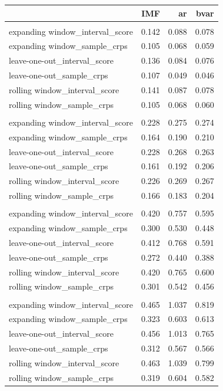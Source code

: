 \documentclass[
]{article}
\begin{document}
\newpage
\begin{longtable}{l|rrr}
\toprule
\multicolumn{1}{l}{} & IMF & ar & bvar \\ 
\midrule\addlinespace[2.5pt]
\multicolumn{4}{l}{horizon = 0} \\ 
\midrule\addlinespace[2.5pt]
expanding window\_interval\_score & 0.142 & 0.088 & 0.078 \\ 
expanding window\_sample\_crps & 0.105 & 0.068 & 0.059 \\ 
leave-one-out\_interval\_score & 0.136 & 0.084 & 0.076 \\ 
leave-one-out\_sample\_crps & 0.107 & 0.049 & 0.046 \\ 
rolling window\_interval\_score & 0.141 & 0.087 & 0.078 \\ 
rolling window\_sample\_crps & 0.105 & 0.068 & 0.060 \\ 
\midrule\addlinespace[2.5pt]
\multicolumn{4}{l}{horizon = 0.5} \\ 
\midrule\addlinespace[2.5pt]
expanding window\_interval\_score & 0.228 & 0.275 & 0.274 \\ 
expanding window\_sample\_crps & 0.164 & 0.190 & 0.210 \\ 
leave-one-out\_interval\_score & 0.228 & 0.268 & 0.263 \\ 
leave-one-out\_sample\_crps & 0.161 & 0.192 & 0.206 \\ 
rolling window\_interval\_score & 0.226 & 0.269 & 0.267 \\ 
rolling window\_sample\_crps & 0.166 & 0.183 & 0.204 \\ 
\midrule\addlinespace[2.5pt]
\multicolumn{4}{l}{horizon = 1} \\ 
\midrule\addlinespace[2.5pt]
expanding window\_interval\_score & 0.420 & 0.757 & 0.595 \\ 
expanding window\_sample\_crps & 0.300 & 0.530 & 0.448 \\ 
leave-one-out\_interval\_score & 0.412 & 0.768 & 0.591 \\ 
leave-one-out\_sample\_crps & 0.272 & 0.440 & 0.388 \\ 
rolling window\_interval\_score & 0.420 & 0.765 & 0.600 \\ 
rolling window\_sample\_crps & 0.301 & 0.542 & 0.456 \\ 
\midrule\addlinespace[2.5pt]
\multicolumn{4}{l}{horizon = 1.5} \\ 
\midrule\addlinespace[2.5pt]
expanding window\_interval\_score & 0.465 & 1.037 & 0.819 \\ 
expanding window\_sample\_crps & 0.323 & 0.603 & 0.613 \\ 
leave-one-out\_interval\_score & 0.456 & 1.013 & 0.765 \\ 
leave-one-out\_sample\_crps & 0.312 & 0.567 & 0.566 \\ 
rolling window\_interval\_score & 0.463 & 1.039 & 0.799 \\ 
rolling window\_sample\_crps & 0.319 & 0.604 & 0.582 \\ 
\bottomrule
\end{longtable}
\end{document}
